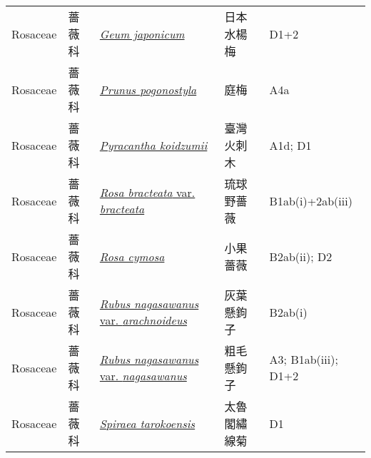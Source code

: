{\begin{longtable}{L{2.5cm}L{2cm}L{5cm}L{2.5cm}L{3cm}}
    Rosaceae & 薔薇科 & \href{http://www.theplantlist.org/tpl1.1/search?q=Geum+japonicum}{\textit{Geum japonicum} } & 日本水楊梅 & D1+2    \\
    Rosaceae & 薔薇科 & \href{http://www.theplantlist.org/tpl1.1/search?q=Prunus+pogonostyla}{\textit{Prunus pogonostyla} } & 庭梅 & A4a    \\
    Rosaceae & 薔薇科 & \href{http://www.theplantlist.org/tpl1.1/search?q=Pyracantha+koidzumii}{\textit{Pyracantha koidzumii} } & 臺灣火刺木 & A1d; D1    \\
    Rosaceae & 薔薇科 & \href{http://www.theplantlist.org/tpl1.1/search?q=Rosa+bracteata+var.+bracteata}{\textit{Rosa bracteata} var. \textit{bracteata} } & 琉球野薔薇 & B1ab(i)+2ab(iii)    \\
    Rosaceae & 薔薇科 & \href{http://www.theplantlist.org/tpl1.1/search?q=Rosa+cymosa}{\textit{Rosa cymosa} } & 小果薔薇 & B2ab(ii); D2    \\
    Rosaceae & 薔薇科 & \href{http://www.theplantlist.org/tpl1.1/search?q=Rubus+nagasawanus+var.+arachnoideus}{\textit{Rubus nagasawanus} var. \textit{arachnoideus} } & 灰葉懸鉤子 & B2ab(i)    \\
    Rosaceae & 薔薇科 & \href{http://www.theplantlist.org/tpl1.1/search?q=Rubus+nagasawanus+var.+nagasawanus}{\textit{Rubus nagasawanus} var. \textit{nagasawanus} } & 粗毛懸鉤子 & A3; B1ab(iii); D1+2    \\
    Rosaceae & 薔薇科 & \href{http://www.theplantlist.org/tpl1.1/search?q=Spiraea+tarokoensis}{\textit{Spiraea tarokoensis} } & 太魯閣繡線菊 & D1    \\

\end{longtable}}
